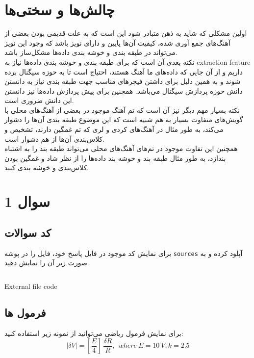 \section{چالش‌ها و سختی‌ها}
اولین مشکلی که شاید به ذهن متبادر شود این است که به علت قدیمی بودن بعضی از آهنگ‌های جمع آوری شده، کیفیت آن‌ها پایین و دارای
نویز باشد که وجود این نویز می‌تواند در طبقه بندی و خوشه بندی داده‌ها مشکل‌ساز باشد. \\
نکته بعدی آن است که برای طبقه بندی و خوشه بندی داده‌ها نیاز به
extraction feature
داریم و از آن جایی 
که داده‌های ما آهنگ هستند، احتیاج است تا به حوزه سیگنال برده شوند و به همین دلیل برای داشتن فیچرهای مناسب جهت طبقه بندی 
نیاز به دانستن دانش حوزه پردازش سیگنال می‌باشد. همچنین برای پیش پردازش داده‌ها نیز دانستن این دانش ضروری است. \\
نکته بسیار مهم دیگر نیز آن است که تم آهنگ موجود در بعضی از آهنگ‌های محلی با گویش‌های متفاوت بسیار به هم شبیه است که 
این موضوع طبقه بندی آن‌ها را دشوار می‌کند، به طور مثال در آهنگ‌های کردی و لری که تم غمگین دارند، تشخیص و کلاس‌بندی آن‌ها
از هم دشوار است. \\
همچنین این تفاوت موجود در تم‌های آهنگ‌های محلی می‌تواند طبقه بند را به اشتباه بندازد، به طور مثال طبقه بند و خوشه بند داده‌ها را از نظر شاد و 
غمگین بودن کلاس‌بندی و خوشه بندی کنند. \\



\section{سوال 1}
\subsection{کد سوالات}

 برای نمایش کد موجود در فایل پاسخ خود،
 فایل را در پوشه 
 \texttt{sources}
 آپلود کرده و به صورت زیر آن را نمایش دهید. 
 
\begin{latin}
\begin{listing}[ht]
    \inputminted{octave}{sources/partition.py}
    \caption{External file code}
    \label{listing:}
\end{listing}
\end{latin}

\subsection{فرمول ها}
\par
برای نمایش فرمول ریاضی می‌توانید از نمونه زیر استفاده کنید:
		\begin{equation}
		|\delta V |=\left[ \frac{E}{4}\right] \ \frac{\delta R}{R}, \ \ where\ E=10\ V, k=2.5
		\end{equation}
\clearpage



